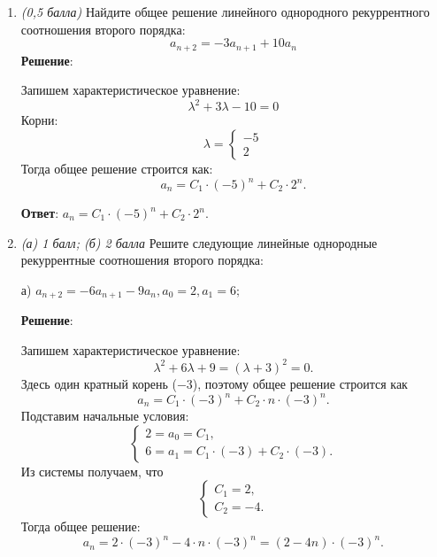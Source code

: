\documentclass{article}
\begin{document}
  \begin{enumerate}
    \item \textit{(0,5 балла)} Найдите общее решение линейного однородного рекуррентного соотношения второго порядка:
    $$a_{n+2} = -3 a_{n+1} + 10 a_n$$
    \textbf{Решение}:
    
    Запишем характеристическое уравнение:
    \begin{equation}
      \lambda^2 + 3\lambda - 10 = 0
    \end{equation}
    Корни:
    \begin{equation}
      \lambda = \begin{cases}
        -5 \\
        2
      \end{cases}
    \end{equation}
    Тогда общее решение строится как:
    \begin{equation}
      a_n = C_1 \cdot (-5)^n + C_2 \cdot 2^n.
    \end{equation}

    \textbf{Ответ}:
    $a_n = C_1 \cdot (-5)^n + C_2 \cdot 2^n.$

    \item \textit{(а) 1 балл; (б) 2 балла} Решите следующие линейные однородные рекуррентные соотношения второго порядка:
    
    а) $a_{n+2} = -6a_{n+1} - 9a_n, a_0 = 2, a_1 = 6;$

    \textbf{Решение}:

    Запишем характеристическое уравнение:
    \begin{equation}
      \lambda^2 + 6\lambda + 9 = (\lambda + 3)^2 = 0.
    \end{equation}
    Здесь один кратный корень ($-3$), поэтому общее решение строится как
    \begin{equation}
      a_n = C_1 \cdot (-3)^n + C_2 \cdot n \cdot (-3)^n.
    \end{equation}
    Подставим начальные условия:
    \begin{equation}
      \begin{cases}
        2 = a_0 = C_1, \\
        6 = a_1 = C_1 \cdot (-3) + C_2 \cdot (-3).
      \end{cases}
    \end{equation}
    Из системы получаем, что
    \begin{equation}
      \begin{cases}
        C_1 = 2, \\
        C_2 = -4.
      \end{cases}
    \end{equation}
    Тогда общее решение:
    \begin{equation}
      a_n = 2 \cdot (-3)^n - 4 \cdot n \cdot (-3)^n = (2 - 4n)\cdot (-3)^n.
    \end{equation}


\end{enumerate}
\end{document}
